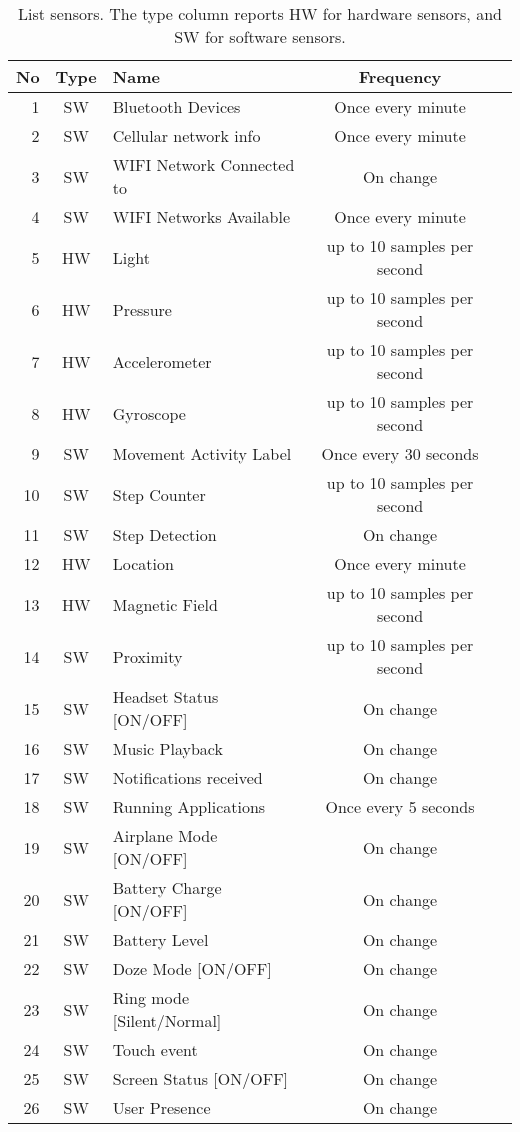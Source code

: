 \begin{table}[tb]
\centering
\caption{\label{tab:sensor-list} List sensors. The type column reports HW for hardware sensors, and SW for software sensors.}
\begin{tabular}{rclcc}
    \toprule
    \textbf{No} & \textbf{Type} & \textbf{Name} & \textbf{Frequency} \\
    \midrule
    1  & SW & Bluetooth Devices                 & Once every minute\\
    2  & SW & Cellular network info             & Once every minute\\
    3  & SW & WIFI Network Connected to         & On change\\
    4  & SW & WIFI Networks Available           & Once every minute\\
    5  & HW & Light                             & up to 10 samples per second \\
    6  & HW & Pressure                          & up to 10 samples per second\\
    7  & HW & Accelerometer                     & up to 10 samples per second \\ 
    8  & HW & Gyroscope                         & up to 10 samples per second  \\
    9 & SW & Movement Activity Label           & Once every 30 seconds\\
    10 & SW & Step Counter                      & up to 10 samples per second\\
    11 & SW & Step Detection                    & On change\\
    12 & HW & Location                          & Once every minute  \\
    13 & HW & Magnetic Field                    & up to 10 samples per second  \\
    14 & SW & Proximity                         & up to 10 samples per second\\
    15 & SW & Headset Status [ON/OFF]           & On change\\
    16 & SW & Music Playback & On change\\
    17 & SW & Notifications received            & On change\\
    18 & SW & Running Applications              & Once every 5 seconds\\
    19 & SW & Airplane Mode [ON/OFF]            & On change\\
    20 & SW & Battery Charge [ON/OFF]           & On change\\
    21 & SW & Battery Level                     & On change\\
    22 & SW & Doze Mode [ON/OFF]                & On change\\
    23 & SW & Ring mode [Silent/Normal]         & On change\\
    24 & SW & Touch event                       & On change\\
    25 & SW & Screen Status [ON/OFF]            & On change\\
    26 & SW & User Presence                     & On change\\
    \bottomrule
\end{tabular}
\end{table}
